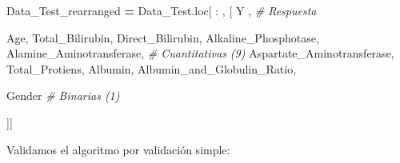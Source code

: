 \documentclass[
  11pt,
  a4paper,
]{article}
\newenvironment{Shaded}{\begin{snugshade}}{\end{snugshade}}
\newcommand{\CommentTok}[1]{\textcolor[rgb]{0.56,0.35,0.01}{\textit{#1}}}
\newcommand{\NormalTok}[1]{#1}
\newcommand{\OperatorTok}[1]{\textcolor[rgb]{0.81,0.36,0.00}{\textbf{#1}}}
\newcommand{\StringTok}[1]{\textcolor[rgb]{0.31,0.60,0.02}{#1}}
\begin{document}
\begin{Shaded}
\begin{Highlighting}[]
\NormalTok{Data\_Test\_rearranged }\OperatorTok{=}\NormalTok{ Data\_Test.loc[ : , [ }\StringTok{\textquotesingle{}Y\textquotesingle{}}\NormalTok{ ,  }\CommentTok{\# Respuesta }

                                         \StringTok{\textquotesingle{}Age\textquotesingle{}}\NormalTok{, }\StringTok{\textquotesingle{}Total\_Bilirubin\textquotesingle{}}\NormalTok{, }\StringTok{\textquotesingle{}Direct\_Bilirubin\textquotesingle{}}\NormalTok{,}
                                         \StringTok{\textquotesingle{}Alkaline\_Phosphotase\textquotesingle{}}\NormalTok{, }\StringTok{\textquotesingle{}Alamine\_Aminotransferase\textquotesingle{}}\NormalTok{,          }\CommentTok{\# Cuantitativas (9)}
                                         \StringTok{\textquotesingle{}Aspartate\_Aminotransferase\textquotesingle{}}\NormalTok{, }\StringTok{\textquotesingle{}Total\_Protiens\textquotesingle{}}\NormalTok{, }\StringTok{\textquotesingle{}Albumin\textquotesingle{}}\NormalTok{,}
                                         \StringTok{\textquotesingle{}Albumin\_and\_Globulin\_Ratio\textquotesingle{}}\NormalTok{,}
    
                                         \StringTok{\textquotesingle{}Gender\textquotesingle{}}   \CommentTok{\# Binarias (1)}

\NormalTok{                                       ]]}
\end{Highlighting}
\end{Shaded}

\vspace{0.35cm}

Validamos el algoritmo por validación simple:
\end{document}
